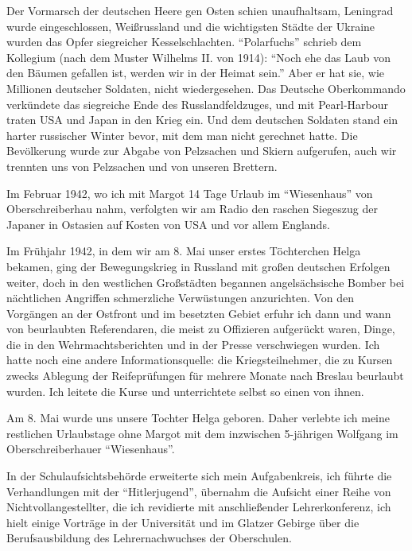  Der Vormarsch der deutschen Heere gen Osten schien unaufhaltsam, Leningrad wurde eingeschlossen, Weißrussland und die wichtigsten Städte der Ukraine wurden das Opfer siegreicher Kesselschlachten. \enquote{Polarfuchs} schrieb dem Kollegium (nach dem Muster Wilhelms II. von 1914): \enquote{Noch ehe das Laub von den Bäumen gefallen ist, werden wir in der Heimat sein.} Aber er hat sie, wie Millionen deutscher Soldaten, nicht wiedergesehen. Das Deutsche Oberkommando verkündete das siegreiche Ende des Russlandfeldzuges, und mit Pearl-Harbour traten USA und Japan in den Krieg ein. Und dem deutschen Soldaten stand ein harter russischer Winter bevor, mit dem man nicht gerechnet hatte. Die Bevölkerung wurde zur Abgabe von Pelzsachen und Skiern aufgerufen, auch wir trennten uns von Pelzsachen und von unseren Brettern.

 Im Februar 1942, wo ich mit Margot 14 Tage Urlaub im \enquote{Wiesenhaus} von Oberschreiberhau nahm, verfolgten wir am Radio den raschen Siegeszug der Japaner in Ostasien auf Kosten von USA und vor allem Englands.

Im Frühjahr 1942, in dem wir am 8. Mai unser erstes Töchterchen Helga bekamen, ging der Bewegungskrieg in Russland mit großen deutschen Erfolgen weiter, doch in den westlichen Großstädten begannen angelsächsische Bomber bei nächtlichen Angriffen schmerzliche Verwüstungen anzurichten. Von den Vorgängen an der Ostfront und im besetzten Gebiet erfuhr ich dann und wann von beurlaubten Referendaren, die meist zu Offizieren aufgerückt waren, Dinge, die in den Wehrmachtsberichten und in der Presse verschwiegen wurden. Ich hatte noch eine andere Informationsquelle: die Kriegsteilnehmer, die zu Kursen zwecks Ablegung der Reifeprüfungen für  mehrere Monate nach Breslau beurlaubt wurden. Ich leitete die Kurse und unterrichtete selbst so einen von ihnen.

Am 8. Mai wurde uns unsere Tochter Helga geboren. Daher verlebte ich meine restlichen Urlaubstage ohne Margot mit dem inzwischen 5-jährigen Wolfgang im Oberschreiberhauer \enquote{Wiesenhaus}.

In der Schulaufsichtsbehörde erweiterte sich mein Aufgabenkreis, ich führte die Verhandlungen mit der \enquote{Hitlerjugend}, übernahm die Aufsicht einer Reihe von Nichtvollangestellter, die ich revidierte mit anschließender Lehrerkonferenz, ich hielt einige Vorträge in der Universität und im Glatzer Gebirge über die Berufsausbildung des Lehrernachwuchses der Oberschulen.

